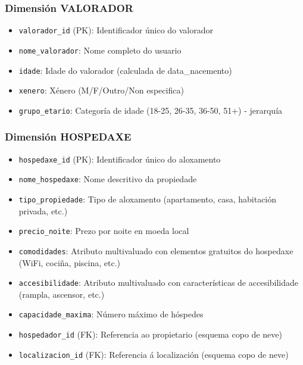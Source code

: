 \documentclass[12pt,a4paper]{article}
\begin{document}
\subsubsection{Dimensión VALORADOR}
\begin{itemize}
    \item \texttt{valorador\_id} (PK): Identificador único do valorador
    \item \texttt{nome\_valorador}: Nome completo do usuario
    \item \texttt{idade}: Idade do valorador (calculada de data\_nacemento)
    \item \texttt{xenero}: Xénero (M/F/Outro/Non especifica)
    \item \texttt{grupo\_etario}: Categoría de idade (18-25, 26-35, 36-50, 51+) - jerarquía
\end{itemize}

\subsubsection{Dimensión HOSPEDAXE}
\begin{itemize}
    \item \texttt{hospedaxe\_id} (PK): Identificador único do aloxamento
    \item \texttt{nome\_hospedaxe}: Nome descritivo da propiedade
    \item \texttt{tipo\_propiedade}: Tipo de aloxamento (apartamento, casa, habitación privada, etc.)
    \item \texttt{precio\_noite}: Prezo por noite en moeda local
    \item \texttt{comodidades}: Atributo multivaluado con elementos gratuitos do hospedaxe (WiFi, cociña, piscina, etc.)
    \item \texttt{accesibilidade}: Atributo multivaluado con características de accesibilidade (rampla, ascensor, etc.)
    \item \texttt{capacidade\_maxima}: Número máximo de hóspedes
    \item \texttt{hospedador\_id} (FK): Referencia ao propietario (esquema copo de neve)
    \item \texttt{localizacion\_id} (FK): Referencia á localización (esquema copo de neve)
\end{itemize}
\end{document}
